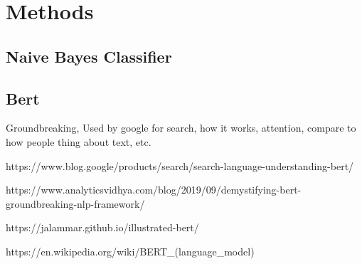 \chapter{Methods}
\label{chap:methods}

\section{Naive Bayes Classifier}



\section{Bert}

Groundbreaking, Used by google for search, how it works, attention, compare to how people thing about text, etc.

https://www.blog.google/products/search/search-language-understanding-bert/

https://www.analyticsvidhya.com/blog/2019/09/demystifying-bert-groundbreaking-nlp-framework/

https://jalammar.github.io/illustrated-bert/

https://en.wikipedia.org/wiki/BERT_(language_model)

